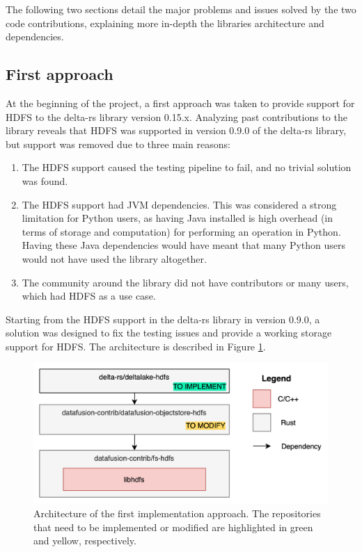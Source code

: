The following two sections detail the major problems and issues solved by the two code contributions, explaining more in-depth the libraries architecture and dependencies.

\subsection{First approach}
At the beginning of the project, a first approach was taken to provide support for \gls{HDFS} to the delta-rs library version 0.15.x. Analyzing past contributions to the library reveals that \gls{HDFS} was supported in version 0.9.0 of the delta-rs library, but support was removed due to three main reasons:
\begin{enumerate}
  \item The \gls{HDFS} support caused the testing pipeline to fail, and no trivial solution was found.
  \item The \gls{HDFS} support had \gls{JVM} dependencies. This was considered a strong limitation for Python users, as having Java installed is high overhead (in terms of storage and computation) for performing an operation in Python. Having these Java dependencies would have meant that many Python users would not have used the library altogether.
  \item The community around the library did not have contributors or many users, which had \gls{HDFS} as a use case.
\end{enumerate}
Starting from the \gls{HDFS} support in the delta-rs library in version 0.9.0, a solution was designed to fix the testing issues and provide a working storage support for \gls{HDFS}. The architecture is described in Figure \ref{fig:approach_1_solution_schema}. 

\begin{figure}[!ht]
  \begin{center}
    \includegraphics[width=\textwidth]{figures/4-implementation/approach1_solution_schema.png}
  \caption[First solution architecture]{Architecture of the first implementation approach. The repositories that need to be implemented or modified are highlighted in green and yellow, respectively.}
  \label{fig:approach_1_solution_schema}
  \end{center}
\end{figure}

